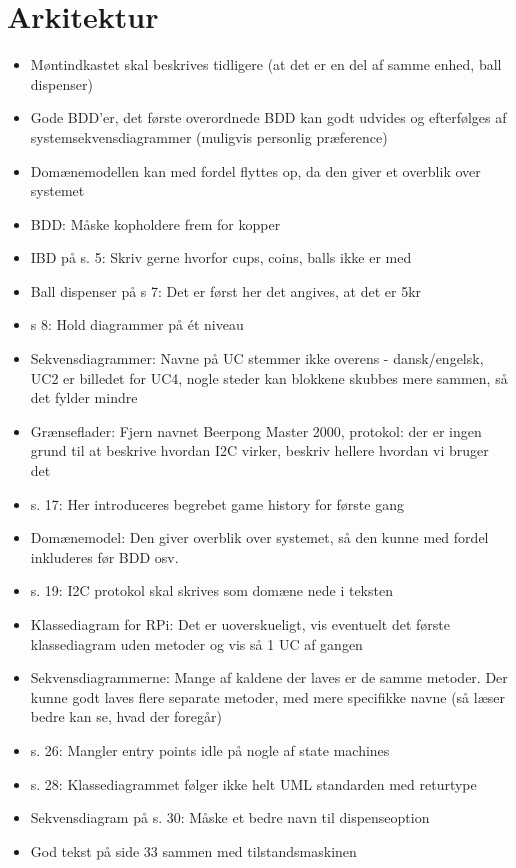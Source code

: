 \documentclass[a4paper,12pt,fleqn,oneside]{article}
\begin{document}
\section{Arkitektur}
\begin{itemize}
    \item Møntindkastet skal beskrives tidligere (at det er en del af samme enhed, ball dispenser) 
    \item Gode BDD'er, det første overordnede BDD kan godt udvides og efterfølges af systemsekvensdiagrammer (muligvis personlig præference)
    \item Domænemodellen kan med fordel flyttes op, da den giver et overblik over systemet 
    \item BDD: Måske kopholdere frem for kopper
    \item IBD på s. 5: Skriv gerne hvorfor cups, coins, balls ikke er med
    \item Ball dispenser på s 7: Det er først her det angives, at det er 5kr
    \item s 8: Hold diagrammer på ét niveau
    \item Sekvensdiagrammer: Navne på UC stemmer ikke overens - dansk/engelsk, UC2 er billedet for UC4, nogle steder kan blokkene skubbes mere sammen, så det fylder mindre
    \item Grænseflader: Fjern navnet Beerpong Master 2000, protokol: der er ingen grund til at beskrive hvordan I2C virker, beskriv hellere hvordan vi bruger det
    \item s. 17: Her introduceres begrebet game history for første gang
    \item Domænemodel: Den giver overblik over systemet, så den kunne med fordel inkluderes før BDD osv.
    \item s. 19: I2C protokol skal skrives som domæne nede i teksten
    \item Klassediagram for RPi: Det er uoverskueligt, vis eventuelt det første klassediagram uden metoder og vis så 1 UC af gangen
    \item Sekvensdiagrammerne: Mange af kaldene der laves er de samme metoder. Der kunne godt laves flere separate metoder, med mere specifikke navne (så læser bedre kan se, hvad der foregår)
    \item s. 26: Mangler entry points idle på nogle af state machines
    \item s. 28: Klassediagrammet følger ikke helt UML standarden med returtype
    \item Sekvensdiagram på s. 30: Måske et bedre navn til dispenseoption
    \item God tekst på side 33 sammen med tilstandsmaskinen
\end{itemize}
\end{document}
